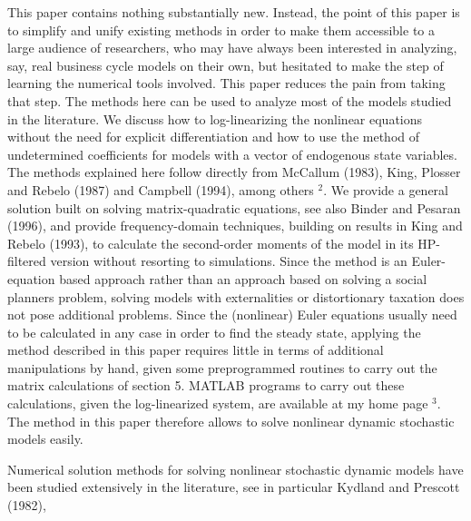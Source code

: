 \documentclass[10pt]{article}
\begin{document}
This paper contains nothing substantially new. Instead, the point of this paper is to simplify and unify existing methods in order to make them accessible to a large audience of researchers, who may have always been interested in analyzing, say, real business cycle models on their own, but hesitated to make the step of learning the numerical tools involved. This paper reduces the pain from taking that step. The methods here can be used to analyze most of the models studied in the literature. We discuss how to log-linearizing the nonlinear equations without the need for explicit differentiation and how to use the method of undetermined coefficients for models with a vector of endogenous state variables. The methods explained here follow directly from McCallum (1983), King, Plosser and Rebelo (1987) and Campbell (1994), among others ${ }^{2}$. We provide a general solution built on solving matrix-quadratic equations, see also Binder and Pesaran (1996), and provide frequency-domain techniques, building on results in King and Rebelo (1993), to calculate the second-order moments of the model in its HP-filtered version without resorting to simulations. Since the method is an Euler-equation based approach rather than an approach based on solving a social planners problem, solving models with externalities or distortionary taxation does not pose additional problems. Since the (nonlinear) Euler equations usually need to be calculated in any case in order to find the steady state, applying the method described in this paper requires little in terms of additional manipulations by hand, given some preprogrammed routines to carry out the matrix calculations of section 5. MATLAB programs to carry out these calculations, given the log-linearized system, are available at my home page ${ }^{3}$. The method in this paper therefore allows to solve nonlinear dynamic stochastic models easily.

Numerical solution methods for solving nonlinear stochastic dynamic models have been studied extensively in the literature, see in particular Kydland and Prescott (1982),
\end{document}
